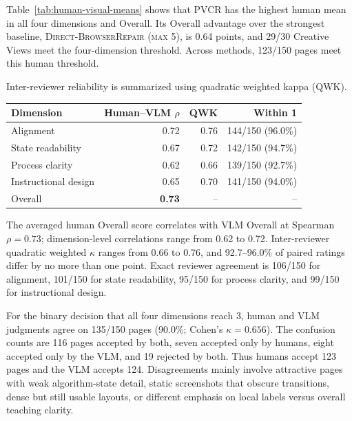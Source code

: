 \documentclass[letterpaper]{article}
\newcommand{\pvcr}{\textsc{PVCR}}
\newcommand{\dbr}{\textsc{Direct-BrowserRepair (max 5)}}
\newenvironment{coltable}
  {\begin{center}\begin{minipage}{\columnwidth}\centering}
  {\end{minipage}\end{center}}
\begin{document}
Table~\ref{tab:human-visual-means} shows that \pvcr{} has the highest human mean in all four dimensions and Overall. Its Overall advantage over the strongest baseline, \dbr{}, is 0.64 points, and 29/30 Creative Views meet the four-dimension threshold. Across methods, 123/150 pages meet this human threshold.

Inter-reviewer reliability is summarized using quadratic weighted kappa (QWK).

\begin{coltable}
\scriptsize
\setlength{\tabcolsep}{2pt}
\begin{tabular}{@{}lrrr@{}}
\toprule
Dimension & Human--VLM $\rho$ & QWK & Within 1 \\
\midrule
Alignment & 0.72 & 0.76 & 144/150 (96.0\%) \\
State readability & 0.67 & 0.72 & 142/150 (94.7\%) \\
Process clarity & 0.62 & 0.66 & 139/150 (92.7\%) \\
Instructional design & 0.65 & 0.70 & 141/150 (94.0\%) \\
Overall & \textbf{0.73} & -- & -- \\
\bottomrule
\end{tabular}
\label{tab:human-vlm-calibration}
\end{coltable}

The averaged human Overall score correlates with VLM Overall at Spearman $\rho=0.73$; dimension-level correlations range from 0.62 to 0.72. Inter-reviewer quadratic weighted $\kappa$ ranges from 0.66 to 0.76, and 92.7--96.0\% of paired ratings differ by no more than one point. Exact reviewer agreement is 106/150 for alignment, 101/150 for state readability, 95/150 for process clarity, and 99/150 for instructional design.

For the binary decision that all four dimensions reach 3, human and VLM judgments agree on 135/150 pages (90.0\%; Cohen's $\kappa=0.656$). The confusion counts are 116 pages accepted by both, seven accepted only by humans, eight accepted only by the VLM, and 19 rejected by both. Thus humans accept 123 pages and the VLM accepts 124. Disagreements mainly involve attractive pages with weak algorithm-state detail, static screenshots that obscure transitions, dense but still usable layouts, or different emphasis on local labels versus overall teaching clarity.
\end{document}
